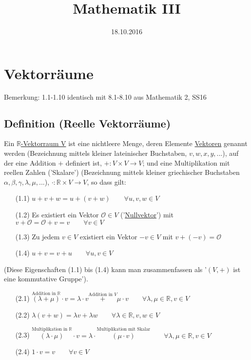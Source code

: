 \documentclass[12pt,titlepage]{article}
\title{Mathematik III}
\date{18.10.2016}
\newcommand{\R}{\mathds{R}}
\renewcommand{\>}{\rightarrow}
\renewcommand{\*}{\cdot}
\renewcommand{\O}{\mathcal{O}}
\begin{document}
	\maketitle
	\tableofcontents
	\newpage
	\section{Vektorräume}
	\small{Bemerkung: 1.1-1.10 identisch mit 8.1-8.10 aus Mathematik 2, SS16}
	\subsection{Definition (Reelle Vektorräume)}
	Ein \underline{$\R$-Vektorraum V} ist eine nichtleere Menge, deren Elemente \underline{Vektoren} genannt werden (Bezeichnung mittels kleiner lateinischer Buchstaben, $v,w,x,y,...$), auf der eine Addition $+$ definiert ist, $+\colon V\times V\>V$; und eine Multiplikation mit reellen Zahlen ('Skalare') (Bezeichnung mittels kleiner griechischer Buchstaben $\alpha, \beta, \gamma, \lambda,\mu,...$), $\*\colon\R\times V\>V$, so dass gilt:
	\begin{itemize}
		\item[(1.1)] $u+v+w=u+(v+w)\qquad\forall u,v,w\in V$
		\item[(1.2)] Es existiert ein Vektor $\O\in V$ ('\underline{Nullvektor}') mit $v+\O=\O+v=v\qquad\forall v\in V$
		\item[(1.3)] Zu jedem $v\in V$ existiert ein Vektor $-v\in V$ mit $v+(-v)=\O$
		\item[(1.4)] $u+v=v+u\qquad\forall u,v\in V$
	\end{itemize}
	(Diese Eigenschaften (1.1) bis (1.4) kann man zusammenfassen als '$(V,+)$ ist eine kommutative Gruppe').
	\begin{itemize}
		\item[(2.1)] $\overset{\textrm{Addition in }\R}{(\lambda+\mu)}\*v=\lambda\*v\overset{\textrm{Addition in }V}{+}\mu\*v\qquad\forall\lambda,\mu\in\R,v\in V$
		\item[(2.2)] $\lambda(v+w)=\lambda v+\lambda w\qquad\forall\lambda\in\R,v,w\in V$
		\item[(2.3)] $\overset{\textrm{Multiplikation in }\R}{(\lambda\*\mu)}\*v=\lambda\*\overset{\textrm{Multiplikation mit Skalar}}{(\mu\*v)}\qquad\forall\lambda,\mu\in\R,v\in V$
		\item[(2.4)] $1\*v=v\qquad\forall v\in V$
	\end{itemize}
\end{document}
